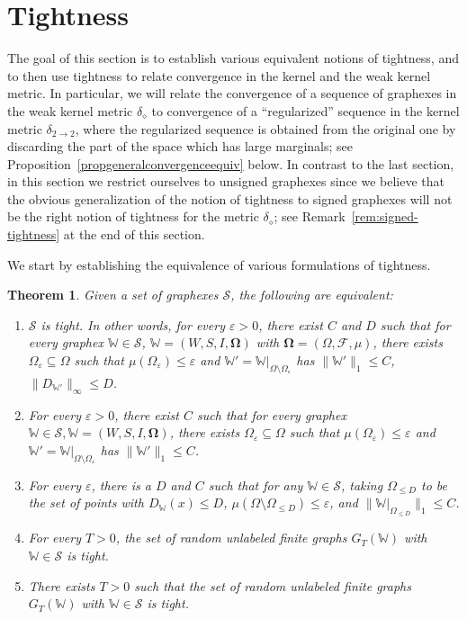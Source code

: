 \documentclass{amsart}
\numberwithin{equation}{section}
\numberwithin{figure}{section}
\newtheorem{theorem}{Theorem}[section]
\theoremstyle{definition}
\theoremstyle{remark}
\newcommand{\bOmega}{{\mathbf{\Omega}}}
\newcommand{\cW}{\mathbb{W}}
\newcommand{\cS}{\mathcal{S}}
\newcommand{\cF}{\mathcal{F}}
\newcommand{\deltt}{\delta_{2\to 2}}
\def\delGP{\delta_\diamond}
\begin{document}
\section{Tightness}
\label{sec:tight}

The goal of this section is to establish various equivalent notions of
tightness, and to then use tightness to relate convergence in the kernel and
the weak kernel metric. In particular, we will relate the convergence of a
sequence of graphexes in the weak kernel metric $\delGP$ to convergence of a
``regularized'' sequence in the kernel metric $\deltt$, where the regularized
sequence is obtained from the original one by discarding the part of the
space which has large marginals; see
Proposition~\ref{propgeneralconvergenceequiv} below. In contrast to the last
section, in this section we restrict ourselves to unsigned graphexes since we
believe that the obvious generalization of the notion of tightness to signed
graphexes will not be the right notion of tightness for the metric $\delGP$;
see Remark~\ref{rem:signed-tightness} at the end of this section.

We start by establishing the equivalence of various formulations of tightness.

\begin{theorem} \label{theoremtightequiv}
Given a set of graphexes $\cS$, the following are equivalent:
\begin{enumerate}
\item $\cS$ is tight. In other words, for every $\varepsilon>0$, there
    exist $C$ and $D$ such that for every graphex $\cW \in \cS$,
 $\cW=(W,S,I,\bOmega)$ with $\bOmega=(\Omega,\cF,\mu)$, there exists
$\Omega_\varepsilon \subseteq \Omega$ such that $\mu(\Omega_\varepsilon)
\le \varepsilon$ and $\cW'=\cW|_{\Omega \setminus \Omega_\varepsilon}$ has
$\|\cW'\|_1 \le C$, $\|D_{\cW'}\|_\infty \le D$. \label{tightCD}
\item For every $\varepsilon>0$, there exist $C$ such that for every
    graphex $\cW \in \cS,\cW=(W,S,I,\bOmega)$, there exists
 $\Omega_\varepsilon \subseteq \Omega$ such that $\mu(\Omega_\varepsilon)
 \le \varepsilon$ and $\cW'=\cW|_{\Omega \setminus \Omega_\varepsilon}$ has
 $\|\cW'\|_1 \le C$. \label{tightC}
\item For every $\varepsilon$, there is a $D$ and $C$ such that for any
    $\cW\in \cS$, taking $\Omega_{\le D}$ to be the set of points with
 $D_\cW(x)\le D$, $\mu(\Omega\setminus\Omega_{\leq D}) \le \varepsilon$,
 and $\|\cW|_{\Omega_{\leq D}}\|_1 \le C$. \label{tightD}
\item For every $T>0$, the set of random unlabeled finite graphs $G_T(\cW)$
    with $\cW \in \cS$ is tight. \label{tightallsamples}
\item There exists $T>0$ such that the set of random unlabeled finite
    graphs $G_T(\cW)$ with $\cW \in \cS$ is tight. \label{tightsomesamples}
\end{enumerate}
\end{theorem}
\end{document}
